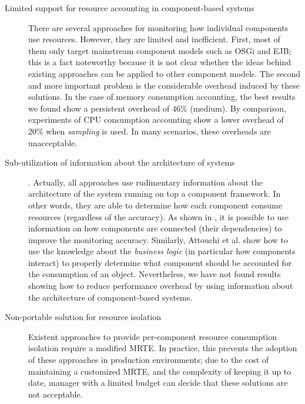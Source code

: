 \begin{description}

\item[Limited support for resource accounting in component-based systems] There are several approaches for monitoring how individual components use resources.
However, they are limited and inefficient.
First, most of them only target mainstream component models such as OSGi and EJB; this is a fact noteworthy because it is not clear whether the ideas behind existing approaches can be applied to other component models.
The second and more important problem is the considerable overhead induced by these solutions.
In the case of memory consumption accounting, the best results we found show a persistent overhead of 46\% (medium).
By comparison, experiments of CPU consumption accounting show a lower overhead of 20\% when \textit{sampling} is used.
In many scenarios, these overheads are unacceptable. 

\item[Sub-utilization of information about the architecture of systems].
Actually, all approaches use rudimentary information about the architecture of the system running on top a component framework.
In other words, they are able to determine how each component consume resources (regardless of the accuracy).
As shown in \cite{Maurel:2012:AME:2304736.2304763}, it is possible to use information on how components are connected (their dependencies) to improve the monitoring accuracy.
Similarly, Attouchi et al. \cite{Attouchi:2014:MMM:2602458.2602467} show how to use the knowledge about the \textit{business logic} (in particular how components interact) to properly determine what component should be accounted for the consumption of an object.
Nevertheless, we have not found results showing how to reduce performance overhead by using information about the architecture of component-based systems. 


\item[Non-portable solution for resource isolation] Existent approaches to provide per-component resource consumption isolation require a modified MRTE.
In practice, this prevents the adoption of these approaches in production environments; due to the cost of maintaining a customized MRTE, and the complexity of keeping it up to date, manager  with a limited budget can decide that these solutions are not acceptable.



\end{description}
